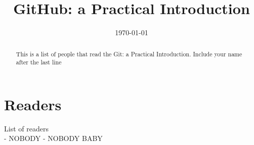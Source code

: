 \documentclass[12pt]{article}
\begin{document}
\title{GitHub: a Practical Introduction} 

\date{\today}

\maketitle 

\begin{abstract} 

	This is a list of people that read the Git: a Practical Introduction. Include your name after the last line
	
\end{abstract}

\section{Readers}
List of readers \\
- NOBODY
- NOBODY BABY
	 
\end{document}
